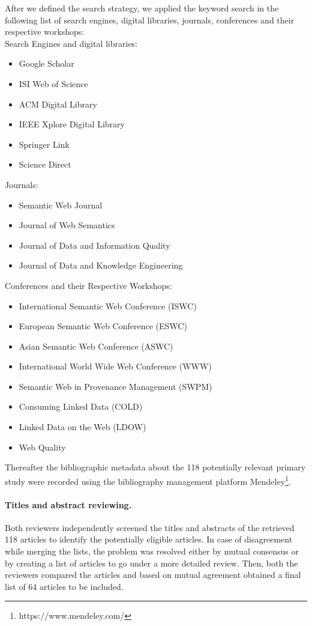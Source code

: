 After we defined the search strategy, we applied the keyword search in the following list of search engines, digital libraries, journals, conferences and their respective workshops: \\
Search Engines and digital libraries:
\begin{itemize}
\item Google Scholar
\item ISI Web of Science
\item ACM Digital Library
\item IEEE Xplore Digital Library
\item Springer Link
\item Science Direct
\end{itemize}
Journals:
\begin{itemize}
\item Semantic Web Journal
\item Journal of Web Semantics
\item Journal of Data and Information Quality
\item Journal of Data and Knowledge Engineering
\end{itemize}
Conferences and their Respective Workshops:
\begin{itemize}
\item International Semantic Web Conference (ISWC)
\item European Semantic Web Conference (ESWC)
\item Asian Semantic Web Conference (ASWC)
\item International World Wide Web Conference (WWW)
\item Semantic Web in Provenance Management (SWPM)
\item Consuming Linked Data (COLD)
\item Linked Data on the Web (LDOW)
\item Web Quality
\end{itemize}
Thereafter the bibliographic metadata about the 118 potentially relevant primary study were recorded using the bibliography management platform Mendeley\footnote{https://www.mendeley.com/}.

\paragraph{Titles and abstract reviewing.}
Both reviewers independently screened the titles and abstracts of the retrieved 118 articles to identify the potentially eligible articles. 
In case of disagreement while merging the lists, the problem was resolved either by mutual consensus or by creating a list of articles to go under a more detailed review. 
Then, both the reviewers compared the articles and based on mutual agreement obtained a final list of 64 articles to be included. 

